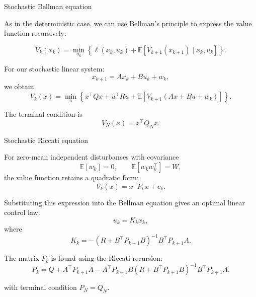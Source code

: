 \documentclass{beamer}
\begin{document}
\begin{frame}{Stochastic Bellman equation}
	\begin{flushleft}
		
As in the deterministic case, we can use Bellman's principle
to express the value function recursively:

\[
V_k(x_k) =
\min_{u_k}
\left\{
\ell(x_k,u_k)
+ \mathbb{E}\left[
V_{k+1}(x_{k+1}) \mid x_k,u_k
\right]
\right\}.
\]

For our stochastic linear system:
\[
x_{k+1}=Ax_k+Bu_k+w_k,
\]
we obtain
\[
\boxed{
	V_k(x) =
	\min_u
	\left\{
	x^\top Qx+u^\top Ru
	+\mathbb{E}\left[
	V_{k+1}(Ax+Bu+w_k)
	\right]
	\right\}.
}
\]

The terminal condition is
\[
V_N(x)=x^\top Q_Nx.
\]
		
	\end{flushleft}
\end{frame}

\begin{frame}{Stochastic Riccati equation}
	\begin{flushleft}
For zero-mean independent disturbances with covariance
\[
\mathbb{E}[w_k]=0,\qquad
\mathbb{E}[w_kw_k^\top]=W,
\]
the value function retains a quadratic form:
\[
\boxed{
	V_k(x)=x^\top P_kx+c_k.
}
\]

Substituting this expression into the Bellman equation gives
an optimal linear control law:
\[
u_k=K_kx_k,
\]
where
\[
	K_k =
	-(R+B^\top P_{k+1}B)^{-1}
	B^\top P_{k+1}A.
\]

The matrix $P_k$ is found using the Riccati recursion:
\[
		P_k=Q+A^\top P_{k+1}A
		-A^\top P_{k+1}B
		(R+B^\top P_{k+1}B)^{-1}
		B^\top P_{k+1}A.
\]

with terminal condition $P_N=Q_N$.
	\end{flushleft}
\end{frame}
\end{document}
